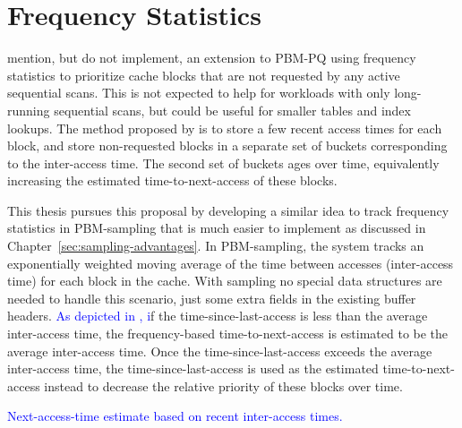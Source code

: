 \section{\label{sec:frequency-stats}Frequency Statistics}

\citet{pbm} mention, but do not implement, an extension to PBM-PQ using frequency statistics to prioritize cache blocks that are not requested by any active sequential scans. This is not expected to help for workloads with only long-running sequential scans, but could be useful for smaller tables and index lookups. The method proposed by \citet{pbm} is to store a few recent access times for each block, and store non-requested blocks in a separate set of buckets corresponding to the inter-access time. The second set of buckets ages over time, equivalently increasing the estimated time-to-next-access of these blocks.

This thesis pursues this proposal by developing a similar idea to track frequency statistics in PBM-sampling that is much easier to implement as discussed in Chapter~\ref{sec:sampling-advantages}. In PBM-sampling, the system tracks an exponentially weighted moving average of the time between accesses (inter-access time) for each block in the cache. With sampling no special data structures are needed to handle this scenario, just some extra fields in the existing buffer headers. \textcolor{blue}{As depicted in , i}f the time-since-last-access is less than the average inter-access time, the frequency-based time-to-next-access is estimated to be the average inter-access time. Once the time-since-last-access exceeds the average inter-access time, the time-since-last-access is used as the estimated time-to-next-access instead to decrease the relative priority of these blocks over time. 

\begin{algorithm}[]
\SetAlgoLined
\SetNoFillComment
\DontPrintSemicolon
{}

\;

\caption{\textcolor{blue}{Next-access-time estimate based on recent inter-access times.}}
\label{alg:sampling_freq}

\end{algorithm}

